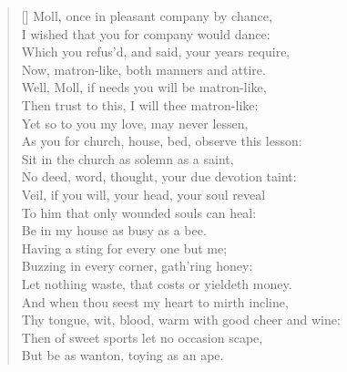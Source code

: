 {\settowidth{\versewidth}{As you for church, house, bed, observe this lesson:dfdffd}
\begin{verse}[\versewidth]
Moll, once in pleasant company by chance,\\
I wished that you for company would dance:\\
Which you refus'd, and said, your years require,\\
Now, matron-like, both manners and attire.\\
Well, Moll, if needs you will be matron-like,\\
Then trust to this, I will thee matron-like:\\
Yet so to you my love, may never lessen,\\
As you for church, house, bed, observe this lesson:\\
Sit in the church as solemn as a saint,\\
No deed, word, thought, your due devotion taint:\\
Veil, if you will, your head, your soul reveal\\
To him that only wounded souls can heal:\\
Be in my house as busy as a bee.\\
Having a sting for every one but me;\\
Buzzing in every corner, gath'ring honey:\\
Let nothing waste, that costs or yieldeth money.\\
And when thou seest my heart to mirth incline,\\
Thy tongue, wit, blood, warm with good cheer and wine:\\
\hspace{0.2\versewidth}Then of sweet sports let no occasion scape,\\
\hspace{0.2\versewidth}But be as wanton, toying as an ape.\\
\end{verse}

}
